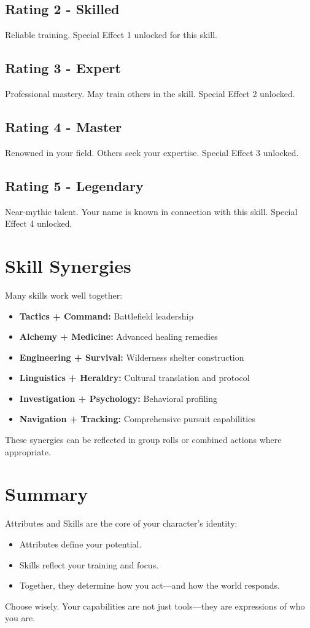 \subsection*{Rating 2 - Skilled}
Reliable training. Special Effect 1 unlocked for this skill.

\subsection*{Rating 3 - Expert}
Professional mastery. May train others in the skill. Special Effect 2 unlocked.

\subsection*{Rating 4 - Master}
Renowned in your field. Others seek your expertise. Special Effect 3 unlocked.

\subsection*{Rating 5 - Legendary}
Near-mythic talent. Your name is known in connection with this skill. Special Effect 4 unlocked.

\section*{Skill Synergies}

Many skills work well together:
\begin{itemize}
    \item \textbf{Tactics + Command:} Battlefield leadership
    \item \textbf{Alchemy + Medicine:} Advanced healing remedies
    \item \textbf{Engineering + Survival:} Wilderness shelter construction
    \item \textbf{Linguistics + Heraldry:} Cultural translation and protocol
    \item \textbf{Investigation + Psychology:} Behavioral profiling
    \item \textbf{Navigation + Tracking:} Comprehensive pursuit capabilities
\end{itemize}

These synergies can be reflected in group rolls or combined actions where appropriate.

\section{Summary}

Attributes and Skills are the core of your character’s identity:

\begin{itemize}
  \item Attributes define your potential.
  \item Skills reflect your training and focus.
  \item Together, they determine how you act—and how the world responds.
\end{itemize}

Choose wisely. Your capabilities are not just tools—they are expressions of who you are.

